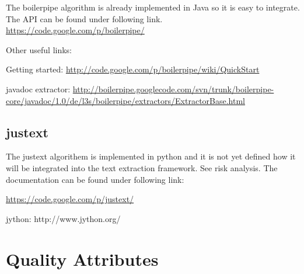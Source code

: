 The boilerpipe algorithm is already implemented in Java so it is easy to integrate. The API can be found under following link. 
\url{https://code.google.com/p/boilerpipe/}

Other useful links:

Getting started:
\url{http://code.google.com/p/boilerpipe/wiki/QuickStart}

javadoc extractor:
\url{http://boilerpipe.googlecode.com/svn/trunk/boilerpipe-core/javadoc/1.0/de/l3s/boilerpipe/extractors/ExtractorBase.html}


\subsection{justext}

The justext algorithem is implemented in python and it is not yet defined how it will be integrated into the text extraction framework. See risk analysis.
The documentation can be found under following link: 

\url{https://code.google.com/p/justext/}

jython:
http://www.jython.org/



\section{Quality Attributes}
